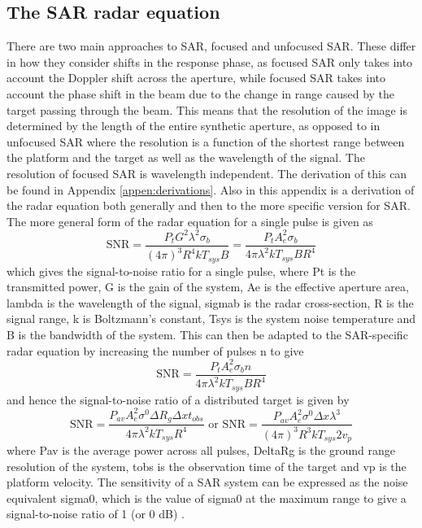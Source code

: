 \subsection{The SAR radar equation}
There are two main approaches to SAR, focused and unfocused SAR. These differ in how they consider shifts in the response phase, as focused SAR only takes into account the Doppler shift across the aperture, while focused SAR takes into account the phase shift in the beam due to the change in range caused by the target passing through the beam. This means that the resolution of the image is determined by the length of the entire synthetic aperture, as opposed to in unfocused SAR where the resolution is a function of the shortest range between the platform and the target as well as the wavelength of the signal. The resolution of focused SAR is wavelength independent. The derivation of this can be found in Appendix \ref{appen:derivations}. Also in this appendix is a derivation of the radar equation both generally and then to the more specific version for SAR. The more general form of the radar equation for a single pulse is given as \[ \text{SNR} = \frac{P_t G^2 \lambda ^ 2 \sigma _b}{(4\pi)^3R^4kT_{sys} B} = \frac{P_t A_e^2 \sigma_b}{4\pi\lambda^2kT_{sys}BR^4}\] which gives the signal-to-noise ratio for a single pulse, where \gls{Pt} is the transmitted power, \gls{G} is the gain of the system, \gls{Ae} is the effective aperture area, \gls{lambda} is the wavelength of the signal, \gls{sigmab} is the radar cross-section, \gls{R} is the signal range, \gls{k} is Boltzmann's constant, \gls{Tsys} is the system noise temperature and \gls{B} is the bandwidth of the system. This can then be adapted to the SAR-specific radar equation by increasing the number of pulses \gls{n} to give \[\text{SNR} = \frac{P_t A_e^2 \sigma_b n}{4\pi \lambda^2kT_{sys}BR^4}\] and hence the signal-to-noise ratio of a distributed target is given by \[\text{SNR}=\frac{P_{av} A_e^2 \sigma^0\Delta R_g \Delta x t_{obs}}{4\pi\lambda^2kT_{sys}R^4} \text{     or     } \text{SNR} = \frac{P_{av}A_e^2\sigma^0\Delta x\lambda^3}{(4\pi)^3R^3kT_{sys}2v_p} \] where \gls{Pav} is the average power across all pulses, \gls{DeltaRg} is the ground range resolution of the system, \gls{tobs} is the observation time of the target and \gls{vp} is the platform velocity. The sensitivity of a SAR system can be expressed as the noise equivalent \gls{sigma0}, which is the value of \gls{sigma0} at the maximum range to give a signal-to-noise ratio of 1 (or 0 dB) \cite{watsonEE40136RadarSystems2020}.


